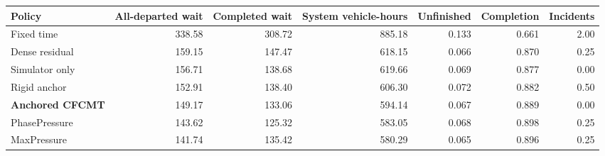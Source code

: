 \begin{tabular}{lrrrrrr}
\toprule
Policy & All-departed wait & Completed wait & System vehicle-hours & Unfinished & Completion & Incidents \\
\midrule
Fixed time & 338.58 & 308.72 & 885.18 & 0.133 & 0.661 & 2.00 \\
Dense residual & 159.15 & 147.47 & 618.15 & 0.066 & 0.870 & 0.25 \\
Simulator only & 156.71 & 138.68 & 619.66 & 0.069 & 0.877 & 0.00 \\
Rigid anchor & 152.91 & 138.40 & 606.30 & 0.072 & 0.882 & 0.50 \\
\textbf{Anchored CFCMT} & 149.17 & 133.06 & 594.14 & 0.067 & 0.889 & 0.00 \\
PhasePressure & 143.62 & 125.32 & 583.05 & 0.068 & 0.898 & 0.25 \\
MaxPressure & 141.74 & 135.42 & 580.29 & 0.065 & 0.896 & 0.25 \\
\bottomrule
\end{tabular}
